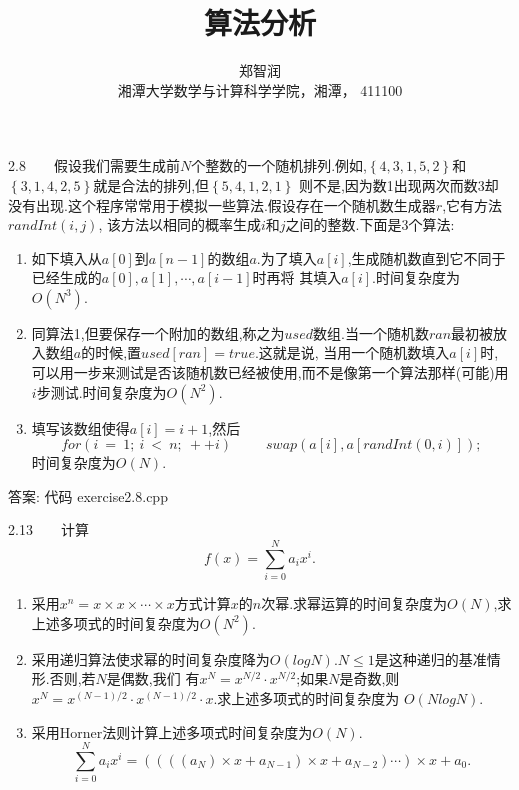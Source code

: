 \documentclass[9pt, a4paper,eqno]{article}
\theoremstyle{plain}
\begin{document}
\begin{CJK}{UTF8}{gkai}
\title{\LARGE
算法分析 
 }
\author {郑智润  \\
\small{湘潭大学数学与计算科学学院，湘潭， 411100 }  \\
}

\date{}

\maketitle \thispagestyle{empty} \large{
}

2.8~~~~假设我们需要生成前$N$个整数的一个随机排列.例如,$\left\lbrace 4,3,1,5,2  \right\rbrace$和
$\left\lbrace 3,1,4,2,5  \right\rbrace$就是合法的排列,但$\left\lbrace 5,4,1,2,1  \right\rbrace$
则不是,因为数1出现两次而数3却没有出现.这个程序常常用于模拟一些算法.假设存在一个随机数生成器$r$,它有方法$randInt(i,j)$,
该方法以相同的概率生成$i$和$j$之间的整数.下面是3个算法:
\begin{enumerate}
\item 如下填入从$a[0]$到$a[n-1]$的数组$a$.为了填入$a[i]$,生成随机数直到它不同于已经生成的$a[0],a[1],\cdots,a[i-1]$时再将
其填入$a[i]$.时间复杂度为$O(N^3)$.
\item 同算法1,但要保存一个附加的数组,称之为$used$数组.当一个随机数$ran$最初被放入数组$a$的时候,置$used[ran]=true$.这就是说,
当用一个随机数填入$a[i]$时,可以用一步来测试是否该随机数已经被使用,而不是像第一个算法那样(可能)用$i$步测试.时间复杂度为$O(N^2)$.
\item 填写该数组使得$a[i] = i+1$,然后
$$
for (i ~=~ 1;~ i~ <~ n;~ ++i)
~~~~~~~~~~~
		swap(a[i],a[randInt(0,i)]);
$$
时间复杂度为$O(N)$.
\end{enumerate}
答案: 代码 exercise2.8.cpp

                                                                                                                                                                                               2.13~~~~计算$$f(x) = \sum_{i=0}^{N}a_ix^i.$$
\begin{enumerate}
\item 采用$x^n = x \times x \times \cdots \times x$方式计算$x$的$n$次幂.求幂运算的时间复杂度为$O(N)$,求上述多项式的时间复杂度为$O(N^2)$.
\item 采用递归算法使求幂的时间复杂度降为$O(logN)$.$N \leq 1$是这种递归的基准情形.否则,若$N$是偶数,我们
有$x^N = x^{N/2} \cdot x^{N/2}$;如果$N$是奇数,则$x^N = x^{(N-1)/2}\cdot x^{(N-1)/2}\cdot x$.求上述多项式的时间复杂度为
$O(NlogN)$.
\item 采用Horner法则计算上述多项式时间复杂度为$O(N)$.$$\sum_{i=0}^{N}a_ix^i = ((((a_N) \times x + a_{N-1}) \times x + a_{N-2})\cdots) \times x + a_0.$$
\end{enumerate}


\end{CJK}
\end{document}
